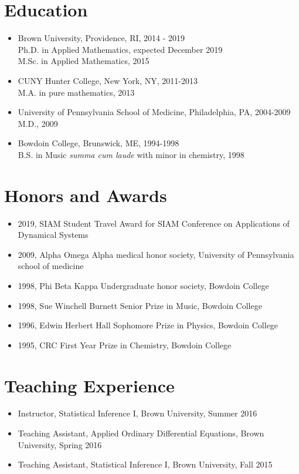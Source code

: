 \section*{Education}

\begin{itemize}
	\item Brown University, Providence, RI, 2014 - 2019\\
	Ph.D. in Applied Mathematics, expected December 2019 \\
	M.Sc. in Applied Mathematics, 2015

	\item CUNY Hunter College, New York, NY, 2011-2013\\
	M.A. in pure mathematics, 2013

	\item University of Pennsylvania School of Medicine, Philadelphia, PA, 2004-2009 \\
	M.D., 2009
	
	\item Bowdoin College, Brunswick, ME, 1994-1998 \\
	B.S. in Music \emph{summa cum laude} with minor in chemistry, 1998\\
\end{itemize}

\section*{Honors and Awards}

\begin{itemize}
	\item 2019, SIAM Student Travel Award for SIAM Conference on Applications of Dynamical Systems
	\item 2009, Alpha Omega Alpha medical honor society, University of Pennsylvania school of medicine
	\item 1998, Phi Beta Kappa Undergraduate honor society, Bowdoin College
	\item 1998, Sue Winchell Burnett Senior Prize in Music, Bowdoin College
	\item 1996, Edwin Herbert Hall Sophomore Prize in Physics, Bowdoin College
	\item 1995, CRC First Year Prize in Chemistry, Bowdoin College
\end{itemize}

\section*{Teaching Experience}
\begin{itemize}
	\item Instructor, Statistical Inference I, Brown University, Summer 2016
	\item Teaching Assistant, Applied Ordinary Differential Equations, Brown University, Spring 2016
	\item Teaching Assistant, Statistical Inference I, Brown University, Fall 2015
\end{itemize}

